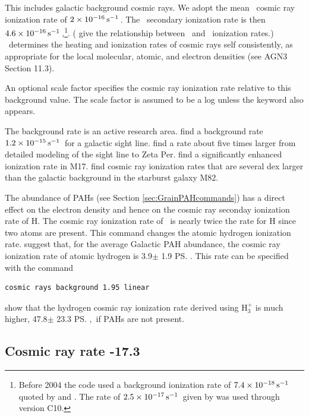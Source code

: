This includes galactic background cosmic rays.
We adopt the \citet{Indriolo2007} mean \hO\ cosmic ray ionization rate 
of $2\times 10^{-16} \mbox{${\rm\thinspace s}^{-1}\,$}$.
The \htwo\ secondary ionization
rate is then $4.6\times 10^{-16} \mbox{${\rm\thinspace s}^{-1}\,$}$,\footnote{Before 2004 the code used a
background ionization rate of $7.4\times 10^{-18} \mbox{${\rm\thinspace s}^{-1}\,$}$
quoted by \citet[Table 10]{Tielens1985a}
and \citet{McKee1999}.
The rate of $2.5\times 10^{-17} \mbox{${\rm\thinspace s}^{-1}\,$}$ given by \citet{Williams1998} was used through
version C10.}.
(\citet{Glassgold.A74Model-calculations-for-diffuse-molecular} give the
relationship between \hO\ and \htwo\ ionization rates.)
\Cloudy\ determines the heating and
ionization rates of cosmic rays self consistently,
as appropriate for the
local molecular, atomic, and electron densities
(see AGN3 Section 11.3).

An optional scale factor specifies the cosmic ray ionization rate
relative to this background value.
The scale factor is assumed to be a
log unless the keyword  also appears.

The background rate is an active research area.
\citet{McCall2003} find a background rate
$1.2 \times 10^{-15} \mbox{${\rm\thinspace s}^{-1}\,$}$ for a galactic
sight line.
\citet{Shaw2008} find a rate about five times larger from detailed
modeling of the sight line to Zeta Per.
\citet{Pellegrini2007} find a significantly enhanced ionization rate in M17.
\citet{Suchkov1993} find cosmic ray ionization rates that are
several dex larger than the galactic background in the starburst galaxy M82. 

The abundance of PAHs (see Section \ref{sec:GrainPAHcommands}) has a
direct effect on the electron density and hence on the cosmic ray seconday
ionization rate of H.  The cosmic ray ionization rate of \htwo\ is nearly twice
the rate for H since two atoms are present.  This command changes the 
atomic hydrogen ionization rate.  
\citet{2021arXiv210103732S} suggest that, for the average Galactic PAH abundance, 
the cosmic ray ionization rate of
atomic hydrogen  is 3.9$\pm$ 1.9 \ps.
This rate can be  specified with the command
\begin{verbatim}
cosmic rays background 1.95 linear
\end{verbatim}
\citet{2021arXiv210103732S}  show that the hydrogen cosmic ray ionization rate derived using
H$_3^+$ is much higher, 47.8$\pm$ 23.3 \ps,\ if PAHs are not present.

\subsection{Cosmic ray rate -17.3}


